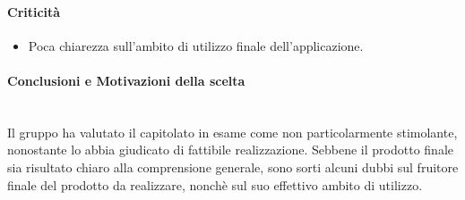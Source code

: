 \paragraph{Criticità}
  \begin{itemize}
    \item Poca chiarezza sull'ambito di utilizzo finale dell'applicazione.
  \end{itemize}

\paragraph{Conclusioni e Motivazioni della scelta} ~\\
Il gruppo ha valutato il capitolato in esame come non particolarmente stimolante, nonostante lo abbia giudicato di fattibile realizzazione. Sebbene il prodotto finale sia risultato chiaro alla comprensione generale, sono sorti alcuni dubbi sul fruitore finale del prodotto da realizzare, nonchè sul suo effettivo ambito di utilizzo.
